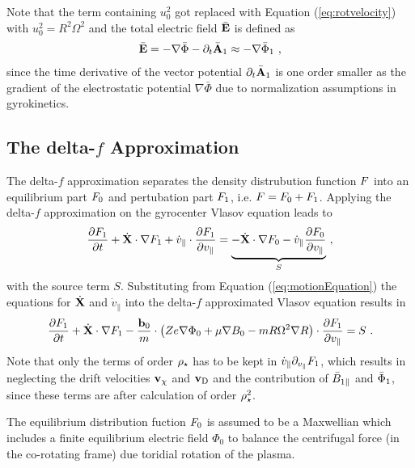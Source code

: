 Note that the term containing $u_0^2$ got replaced with Equation (\ref{eq:rotvelocity}) with $u_0^2 = R^2 \Omega^2$ and the total electric field $\bar{\boldsymbol{\mathbf{E}}}$ is defined as 
\begin{gather}
	\bar{\boldsymbol{\mathbf{E}}} = - \nabla \bar{\Phi} - \partial_t \bar{\boldsymbol{\mathbf{A}}}_1 \approx - \nabla \bar{\Phi}_1 ~,
	\label{eq:totalElectricField}
\end{gather}
since the time derivative of the vector potential $\partial_t \bar{\boldsymbol{\mathbf{A}}}_1$ is one order smaller as the gradient of the electrostatic potential $\nabla \bar{\Phi}$ due to normalization assumptions in gyrokinetics\cite{Peeters2009A}.




\newpage

\subsection{The delta-\!$f$ Approximation}
\label{sub:approximation}

The delta-\!$f$ approximation separates the density distrubution function $F$ into an equilibrium part $F_0$ and pertubation part $F_1$, i.e. $F = F_0 + F_1$. Applying the delta-\!$f$ approximation on the gyrocenter Vlasov equation leads to
\begin{gather}
	\frac{\partial F_1}{\partial t} + \dot{\boldsymbol{\mathbf{X}}} \cdot \nabla F_1 + \dot{v}_\parallel \cdot \frac{\partial F_1}{\partial v_\parallel} = \underbrace{- \dot{\boldsymbol{\mathbf{X}}} \cdot \nabla F_0 - \dot{v}_\parallel \frac{\partial F_0}{\partial v_\parallel}}_S~,
	\label{eq:gyrocenterDeltafVlasov}
\end{gather}
with the source term $S$. Substituting from Equation (\ref{eq:motionEquation}) the equations for $\dot{\boldsymbol{\mathbf{X}}}$ and $\dot{v}_\parallel$ into the delta-$f$ approximated Vlasov equation results in
\begin{gather}
	\frac{\partial F_1}{\partial t} + \dot{\boldsymbol{\mathbf{X}}} \cdot \nabla F_1 - \frac{\boldsymbol{\mathbf{b}}_0}{m} \cdot \left(Ze\nabla \Phi_0 + \mu \nabla B_0 - mR \Omega^2 \nabla R \right) \cdot \frac{\partial F_1}{\partial v_\parallel} = S~.
	\label{eq:gyrocenterDeltafSubVlasov}
\end{gather}
Note that only the terms of order $\rho_\star$ has to be kept in $\dot{v}_\parallel \partial_{v_\parallel} F_1$, which results in neglecting the drift velocities $\boldsymbol{\mathbf{v}}_\chi$ and $\boldsymbol{\mathbf{v}}_\mathrm{D}$ and the contribution of $\bar{B}_{1\parallel}$ and $\bar{\Phi}_1$, since these terms are after calculation of order $\rho_\star^2$. \bigskip

The equilibrium distribution fuction $F_0$ is assumed to be a Maxwellian which includes a finite equilibrium electric field $\Phi_0$ to balance the centrifugal force (in the co-rotating frame) due toridial rotation of the plasma. 


